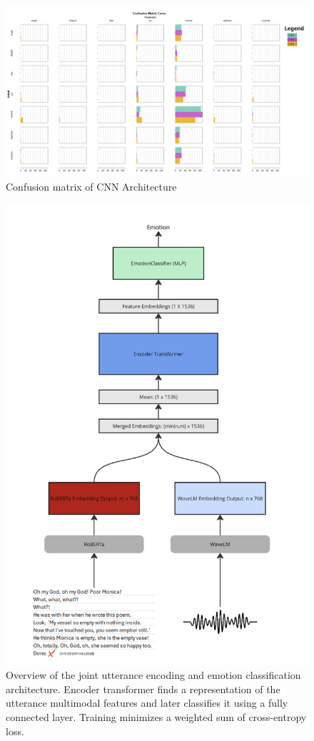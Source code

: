 \documentclass{article}
\begin{document}
\begin{figure}[hbtp]
  \centering
  \includegraphics[width=0.8\linewidth]{Images/cnn_confusion_matrix.png}
  \caption{Confusion matrix of CNN Architecture}
  \label{fig:cnn_confusion_matrix}
\end{figure}

\begin{figure}[hbtp]
  \centering
  \includegraphics[width=0.8\linewidth]{Images/transformer_encoder.png}
  \caption{Overview of the joint utterance encoding and emotion classification architecture. Encoder transformer finds a representation of the utterance multimodal features and later classifies it using a fully connected layer. Training minimizes a weighted sum of cross-entropy loss.}
  \label{fig:transf-enc}
\end{figure}
\end{document}

